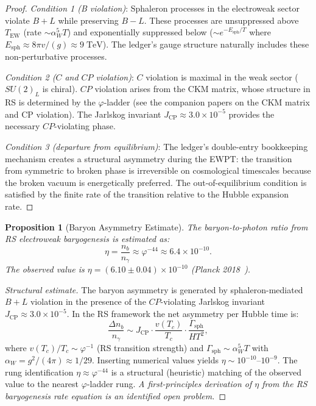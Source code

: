 \documentclass[12pt,a4paper]{article}
\newtheorem{proposition}[theorem]{Proposition}
\theoremstyle{definition}
\theoremstyle{remark}
\begin{document}
\begin{proof}
\textit{Condition 1 (B violation)}:
Sphaleron processes in the electroweak sector violate $B + L$ while
preserving $B - L$.  These processes are unsuppressed above
$T_{\mathrm{EW}}$ (rate $\sim \alpha_W^5 T$) and exponentially
suppressed below ($\sim e^{-E_{\mathrm{sph}}/T}$ where
$E_{\mathrm{sph}} \approx 8\pi v/(g) \approx 9\;\mathrm{TeV}$).
The ledger's gauge structure naturally includes these non-perturbative
processes.

\textit{Condition 2 ($C$ and $CP$ violation)}:
$C$ violation is maximal in the weak sector ($SU(2)_L$ is chiral).
$CP$ violation arises from the CKM matrix, whose structure in RS
is determined by the $\varphi$-ladder (see the companion papers on
the CKM matrix and CP violation).  The Jarlskog invariant
$J_{\mathrm{CP}} \approx 3.0 \times 10^{-5}$ provides the
necessary $CP$-violating phase.

\textit{Condition 3 (departure from equilibrium)}:
The ledger's double-entry bookkeeping mechanism creates a structural
asymmetry during the EWPT: the transition from symmetric to broken
phase is irreversible on cosmological timescales because the broken
vacuum is energetically preferred.  The out-of-equilibrium condition
is satisfied by the finite rate of the transition relative to the
Hubble expansion rate.
\end{proof}

\begin{proposition}[Baryon Asymmetry Estimate]
\label{prop:eta}
The baryon-to-photon ratio from RS electroweak baryogenesis is
estimated as:
\begin{equation}
  \eta = \frac{n_b}{n_\gamma} \approx \varphi^{-44}
  \approx 6.4 \times 10^{-10}.
  \label{eq:eta}
\end{equation}
The observed value is $\eta = (6.10 \pm 0.04) \times 10^{-10}$
(Planck 2018~\cite{Planck2018BBN}).
\end{proposition}

\begin{proof}[Structural estimate]
The baryon asymmetry is generated by sphaleron-mediated $B+L$
violation in the presence of the $CP$-violating Jarlskog invariant
$J_{\mathrm{CP}} \approx 3.0 \times 10^{-5}$.  In the RS
framework the net asymmetry per Hubble time is:
\begin{equation}
  \frac{\Delta n_b}{n_\gamma}
  \sim J_{\mathrm{CP}} \cdot \frac{v(T_c)}{T_c}
  \cdot \frac{\Gamma_{\mathrm{sph}}}{H T^2},
\end{equation}
where $v(T_c)/T_c \sim \varphi^{-1}$ (RS transition strength) and
$\Gamma_{\mathrm{sph}} \sim \alpha_W^5 T$ with
$\alpha_W = g^2/(4\pi) \approx 1/29$.  Inserting numerical values
yields $\eta \sim 10^{-10}$--$10^{-9}$.  The rung identification
$\eta \approx \varphi^{-44}$ is a structural (heuristic) matching
of the observed value to the nearest $\varphi$-ladder rung.
\emph{A first-principles derivation of $\eta$ from the RS
baryogenesis rate equation is an identified open problem.}
\end{proof}
\end{document}
